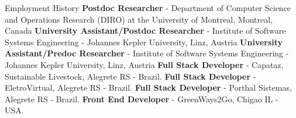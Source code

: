 \begin{rubric}{Employment History}
\entry*[2025 -- $\cdots$]%
	\textbf{Postdoc Researcher} - Department of Computer Science and Operations Research (DIRO) at the University of Montreal, Montreal, Canada
\entry*[2023 -- 2025]%
	\textbf{University Assistant/Postdoc Researcher} - Institute of Software Systems Engineering - Johannes Kepler University, Linz, Austria
 \entry*[2020 -- 2023]%
	\textbf{University Assistant/Predoc Researcher} - Institute of Software Systems Engineering - Johannes Kepler University, Linz, Austria
%
%
\entry*[2019 -- 2020]%
	\textbf{Full Stack Developer} - Capataz,  Sustainable Livestock, Alegrete RS - Brazil.
\entry*[2019 -- 2020]%
	\textbf{Full Stack Developer} - EletroVirtual, Alegrete RS - Brazil.
\entry*[2017 -- 2017]%
	\textbf{Full Stack Developer} - Porthal Sistemas, Alegrete RS - Brazil.
\entry*[2014 -- 2014]%
	\textbf{Front End Developer} - GreenWays2Go, Chigao IL - USA.
\end{rubric}